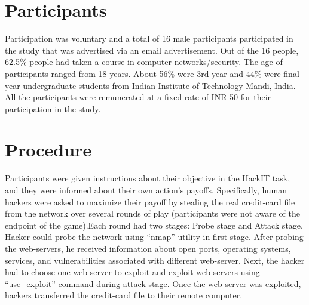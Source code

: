 \section{Participants}
Participation was voluntary and a total of 16 male participants participated in the study that was advertised via an email advertisement. Out of the 16 people, 62.5\% people had taken a course in computer networks/security. The age of participants ranged from 18 years. About 56\% were 3rd year and 44\% were final year undergraduate students from Indian Institute of Technology Mandi, India. All the participants were remunerated at a fixed rate of INR 50 for their participation in the study.

\section{Procedure}
Participants were given instructions about their objective in the HackIT task, and they were informed about their own action’s payoffs. Specifically, human hackers were asked to maximize their payoff by stealing the real credit-card file from the network over several rounds of play (participants were not aware of the endpoint of the game).Each round had two stages: Probe stage and Attack stage. Hacker could probe the network using \enquote{nmap} utility in first stage. After probing the web-servers, he received information about open ports, operating systems, services, and vulnerabilities associated with different web-server. Next, the hacker had to choose one web-server to exploit and exploit web-servers using “use\_exploit” command during attack stage. Once the web-server was exploited, hackers transferred the credit-card file to their remote computer.

